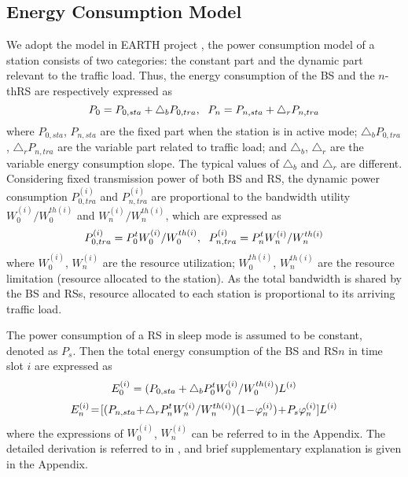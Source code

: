 \documentclass[conference]{IEEEtran}
\begin{document}
 \subsection{Energy Consumption Model}
 We adopt the model in EARTH project \cite{Muhammad2012Energy}, the power consumption model of a station consists of two categories: the constant part and the dynamic part relevant to the traffic load. Thus, the energy consumption of the BS and the $n$-thRS are respectively expressed as
 \begin{equation}\label{equ:energy consumption}
  \small{P_0 = P_{0,sta}+\triangle_bP_{0,tra}},~~
  \small{P_n = P_{n,sta}+\triangle_rP_{n,tra}}
 \end{equation}
where $P_{0,sta}$, $P_{n,sta}$ are the fixed part when the station is in active mode; $\triangle_bP_{0,tra}$, $\triangle_rP_{n,tra}$ are the variable part related to traffic load; and $\triangle_b$, $\triangle_r$ are the variable energy consumption slope. The typical values of $\triangle_b$ and $\triangle_r$ are different. Considering fixed transmission power of both BS and RS, the dynamic power consumption $P^{(i)}_{0,tra}$ and $P^{(i)}_{n,tra}$ are proportional to the bandwidth utility $W^{(i)}_0/W^{th(i)}_0$ and $W^{(i)}_n/W^{th(i)}_n$, which are expressed as
 \begin{equation}\label{equ:dynamic power consumption}
 \small{P^{(i)}_{0,tra} = P_0^tW^{(i)}_0/W^{th(i)}_0},~~
 \small{P^{(i)}_{n,tra} = P_n^tW^{(i)}_n/W^{th(i)}_n}
 \end{equation}
where $W_0^{(i)}$, $W_n^{(i)}$ are the resource utilization; $W_0^{th(i)}$, $W_n^{th(i)}$ are the resource limitation (resource allocated to the station). As the total bandwidth is shared by the BS and RSs, resource allocated to each station is proportional to its arriving traffic load.

 The power consumption of a RS in sleep mode is assumed to be constant, denoted as $P_s$. Then the total energy consumption of the BS and RS$n$ in time slot $i$ are expressed as
 \begin{equation}\label{equ:energy consumption of BS}
  \small{E^{(i)}_0 = (P_{0,sta}+\triangle_bP_0^tW^{(i)}_0/W^{th(i)}_0)L^{(i)}}
 \end{equation}
 \begin{equation}\label{equ:energy consumption of RS}
  \small{E^{(i)}_n\!=\![(P_{n,sta}\!+\!\triangle_rP_n^tW^{(i)}_n/W^{th(i)}_n)(1\!-\!\varphi^{(i)}_n)\!+\!P_s\varphi^{(i)}_n]L^{(i)}}
 \end{equation}
 where the expressions of $W^{(i)}_0$, $W^{(i)}_n$ can be referred to in the Appendix. The detailed derivation is referred to in \cite{Jie2012Adynamic}, and brief supplementary explanation is given in the Appendix.
\end{document}
